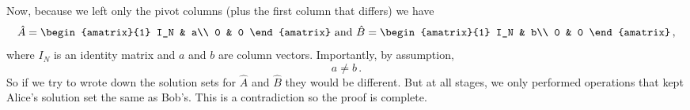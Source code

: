 {Now, because we left only the pivot columns (plus the first column that differs) we have
\[\hat{A}=\begin{amatrix}{1}
I_N & a\\
0 & 0
\end{amatrix} \mbox{ and } \hat{B}=\begin{amatrix}{1}
I_N & b\\
0 & 0
\end{amatrix}\, ,\] where $I_N$ is an identity matrix and $a$ and $b$ are column vectors.
Importantly, by assumption,
\[
a\neq b\, .
\]
So if we try to wrote down the solution sets for $\widehat A$ and $\widehat B$ they would be different.
But at all stages, we only performed operations that kept Alice's solution set the same as Bob's.
This is a contradiction so the proof is complete.
} %

\newpage
